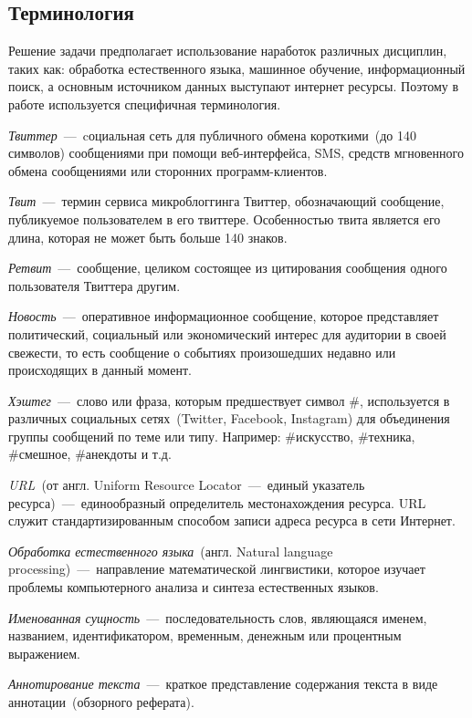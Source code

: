 \subsection{Терминология}
    Решение задачи предполагает использование наработок различных дисциплин, таких как: обработка естественного языка, машинное обучение, информационный поиск,
    а основным источником данных выступают интернет ресурсы.
    Поэтому в работе используется специфичная терминология.

    \textit{Твиттер}~---~cоциальная сеть для публичного обмена короткими~(до 140 символов) сообщениями при помощи веб-интерфейса, SMS,
    средств мгновенного обмена сообщениями или сторонних программ-клиентов.

    \textit{Твит}~---~термин сервиса микроблоггинга Твиттер, обозначающий сообщение, публикуемое пользователем в его твиттере.
    Особенностью твита является его длина, которая не может быть больше 140 знаков.

    \textit{Ретвит}~---~сообщение, целиком состоящее из цитирования сообщения одного пользователя Твиттера другим.

    \textit{Новость}~---~оперативное информационное сообщение, которое представляет политический, социальный или экономический интерес для аудитории в своей свежести,
    то есть сообщение о событиях произошедших недавно или происходящих в данный момент.

    \textit{Хэштег}~---~слово или фраза, которым предшествует символ \#, используется в различных социальных сетях~(Twitter, Facebook, Instagram)
    для объединения группы сообщений по теме или типу.
    Например: \#искусство, \#техника, \#смешное, \#анекдоты и т.д.

    \textit{URL}~(от англ. Uniform Resource Locator~---~единый указатель ресурса)~---~единообразный определитель местонахождения ресурса.
    URL служит стандартизированным способом записи адреса ресурса в сети Интернет.

    \textit{Обработка естественного языка}~(англ. Natural language processing)~---~направление математической лингвистики,
    которое изучает проблемы компьютерного анализа и синтеза естественных языков.

    \textit{Именованная сущность}~---~последовательность слов, являющаяся именем, названием, идентификатором, временным, денежным или процентным выражением.

    \textit{Аннотирование текста}~---~краткое представление содержания текста в виде аннотации~(обзорного реферата).

